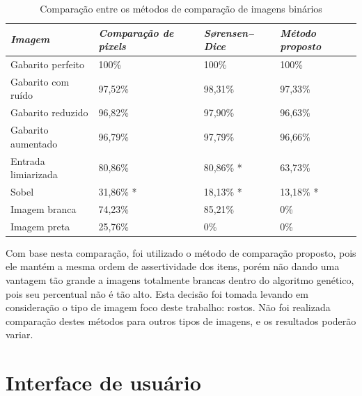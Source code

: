 \documentclass[12pt,oneside,a4paper,english,french,spanish,brazil,]{abntex2}
\begin{document}
\begin{table}
\centering
\caption{Comparação entre os métodos de comparação de imagens binários}
\label{tab:ComparacaoImagens}
\begin{tabular}{llll}
\hline
\textit{\textbf{Imagem}} & \textit{\textbf{Comparação de pixels}} & \textit{\textbf{Sørensen–Dice}} & \textit{\textbf{Método proposto}} \\ \hline
Gabarito perfeito        & 100\%                                  & 100\%                           & 100\%                             \\
Gabarito com ruído       & 97,52\%                                & 98,31\%                         & 97,33\%                           \\
Gabarito reduzido        & 96,82\%                                & 97,90\%                         & 96,63\%                           \\
Gabarito aumentado       & 96,79\%                                & 97,79\%                         & 96,66\%                           \\
Entrada limiarizada      & 80,86\%                                & 80,86\% *                       & 63,73\%                            \\
Sobel                    & 31,86\% *                              & 18,13\% *                       & 13,18\% *                          \\
Imagem branca            & 74,23\%                                & 85,21\%                         & 0\%                           \\
Imagem preta             & 25,76\%                                & 0\%                             & 0\% \\ \hline
\end{tabular}
\end{table}

Com base nesta comparação, foi utilizado o método de comparação proposto, pois ele mantém a mesma ordem de  assertividade dos itens, porém não dando uma vantagem tão grande a imagens totalmente brancas dentro do algoritmo genético, pois seu percentual não é tão alto. Esta decisão foi tomada levando em consideração o tipo de imagem foco deste trabalho: rostos. Não foi realizada comparação destes métodos para outros tipos de imagens, e os resultados poderão variar.

\section{Interface de usuário}
\end{document}
